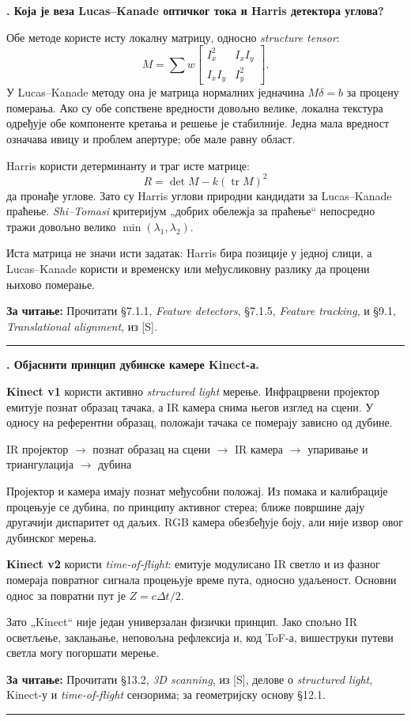 \documentclass[10pt,a4paper]{article}
\newcommand{\en}[1]{\textit{#1}}
\newcounter{pitanje}
\newenvironment{odgovor}[1]{\stepcounter{pitanje}\begin{minipage}[t][0.455\textheight][t]{\textwidth}\vspace{0pt}\textbf{\thepitanje. #1}\par\smallskip}{\end{minipage}\par\ifodd\value{pitanje}\vspace{0.025\textheight}\hrule\vspace{0.015\textheight}\else\newpage\fi}
\newcommand{\izvor}[1]{\par\vfill{\footnotesize\textbf{За читање:} #1}\par}
\newcommand{\lanac}[1]{\begin{center}\small #1\end{center}}
\begin{document}
\begin{odgovor}{Која је веза Lucas--Kanade оптичког тока и Harris детектора углова?}
Обе методе користе исту локалну матрицу, односно \en{structure tensor}:
\[
M=\sum w
\begin{bmatrix}I_x^2&I_xI_y\\I_xI_y&I_y^2\end{bmatrix}.
\]
У Lucas--Kanade методу она је матрица нормалних једначина $M\delta=b$ за процену померања. Ако су обе сопствене вредности довољно велике, локална текстура одређује обе компоненте кретања и решење је стабилније. Једна мала вредност означава ивицу и проблем апертуре; обе мале равну област.

Harris користи детерминанту и траг исте матрице:
\[
R=\det M-k(\operatorname{tr}M)^2
\]
да пронађе углове. Зато су Harris углови природни кандидати за Lucas--Kanade праћење. \en{Shi--Tomasi} критеријум „добрих обележја за праћење“ непосредно тражи довољно велико $\min(\lambda_1,\lambda_2)$.

Иста матрица не значи исти задатак: Harris бира позиције у једној слици, а Lucas--Kanade користи и временску или међусликовну разлику да процени њихово померање.
\izvor{Прочитати §7.1.1, \en{Feature detectors}, §7.1.5, \en{Feature tracking}, и §9.1, \en{Translational alignment}, из [S].}
\end{odgovor}

\begin{odgovor}{Објаснити принцип дубинске камере Kinect-а.}
\textbf{Kinect v1} користи активно \en{structured light} мерење. Инфрацрвени пројектор емитује познат образац тачака, а IR камера снима његов изглед на сцени. У односу на референтни образац, положаји тачака се померају зависно од дубине.
\lanac{IR пројектор $\to$ познат образац на сцени $\to$ IR камера $\to$ упаривање и триангулација $\to$ дубина}
Пројектор и камера имају познат међусобни положај. Из помака и калибрације процењује се дубина, по принципу активног стереа; ближе површине дају другачији диспаритет од даљих. RGB камера обезбеђује боју, али није извор овог дубинског мерења.

\textbf{Kinect v2} користи \en{time-of-flight}: емитује модулисано IR светло и из фазног помераја повратног сигнала процењује време пута, односно удаљеност. Основни однос за повратни пут је $Z=c\Delta t/2$.

Зато „Kinect“ није један универзалан физички принцип. Јако спољно IR осветљење, заклањање, неповољна рефлексија и, код ToF-а, вишеструки путеви светла могу погоршати мерење.
\izvor{Прочитати §13.2, \en{3D scanning}, из [S], делове о \en{structured light}, Kinect-у и \en{time-of-flight} сензорима; за геометријску основу §12.1.}
\end{odgovor}
\end{document}
